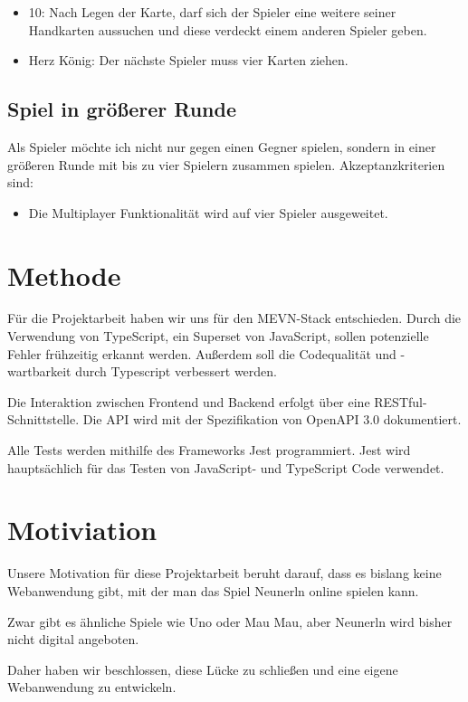 \documentclass[letterpaper, 10 pt, conference]{IEEEtran}
\begin{document}
\begin{itemize}

\item	10: Nach Legen der Karte, darf sich der Spieler eine weitere seiner Handkarten aussuchen und diese verdeckt einem anderen Spieler geben.
\item	Herz König: Der nächste Spieler muss vier Karten ziehen.

\end{itemize}


\subsection{Spiel in größerer Runde}

Als Spieler möchte ich nicht nur gegen einen Gegner spielen, sondern in einer größeren Runde mit bis zu vier Spielern zusammen spielen. Akzeptanzkriterien sind:

\begin{itemize}

\item	Die Multiplayer Funktionalität wird auf vier Spieler ausgeweitet.

\end{itemize}


\section{Methode}

Für die Projektarbeit haben wir uns für den MEVN-Stack entschieden. Durch die Verwendung von TypeScript, ein Superset von JavaScript, sollen potenzielle Fehler frühzeitig erkannt werden. Außerdem soll die Codequalität und -wartbarkeit durch Typescript verbessert werden.

Die Interaktion zwischen Frontend und Backend erfolgt über eine RESTful-Schnittstelle. Die API wird mit der Spezifikation von OpenAPI 3.0 dokumentiert.

Alle Tests werden mithilfe des Frameworks Jest programmiert. Jest wird hauptsächlich für das Testen von JavaScript- und TypeScript Code verwendet.



\section{Motiviation}

Unsere Motivation für diese Projektarbeit beruht darauf, dass es bislang keine Webanwendung gibt, mit der man das Spiel Neunerln online spielen kann.

Zwar gibt es ähnliche Spiele wie Uno oder Mau Mau, aber Neunerln wird bisher nicht digital angeboten.

Daher haben wir beschlossen, diese Lücke zu schließen und eine eigene Webanwendung zu entwickeln.


\end{document}
